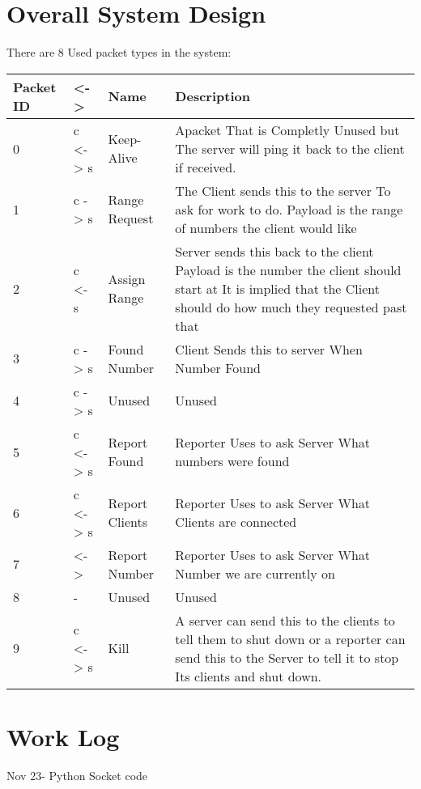 \documentclass[letterpaper,10pt,titlepage]{article}
\begin{document}
\tableofcontents

\section{Overall System Design}

There are 8 Used packet types in the system:

\begin{center}
    \begin{tabular}{ | l | l | l | p{5cm} |}
    \hline
    Packet ID & <-> & Name & Description \\ \hline
    0 & c <-> s & Keep-Alive & Apacket That is Completly Unused but   
    The server will ping it back to the client if received. \\ \hline
    1 & c -> s & Range Request & The Client sends this to the server
    To ask for work to do.  Payload is the range
    of numbers the client would like \\ \hline
    2 & c <- s & Assign Range & Server sends this back to the client
    Payload is the number the client should start at
    It is implied that the Client should do how much they requested past that \\ \hline
	3 & c -> s & Found Number & Client Sends this to server When Number Found \\ \hline
	4 & c -> s & Unused & Unused \\ \hline
	5 & c <-> s & Report Found & Reporter Uses to ask Server What numbers were found \\ \hline
	6 & c <-> s & Report Clients & Reporter Uses to ask Server What Clients are connected \\ \hline
	7 & <-> & Report Number & Reporter Uses to ask Server What Number we are currently on \\ \hline
	8 & - & Unused & Unused \\ \hline
	9 & c <-> s & Kill & A server can send this to the clients to tell them to shut down
    or a reporter can send this to the Server to tell it to stop
	Its clients and shut down.\\ \hline
    \end{tabular}
\end{center}

\section{Work Log}

Nov 23- Python Socket code
\end{document}
